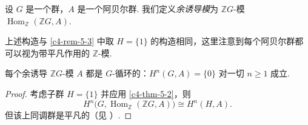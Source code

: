 \begin{definition}\label{c4-def-5-4}
设 $G$ 是一个群，$A$ 是一个阿贝尔群. 我们定义\emph{余诱导模}为 $\mathbb ZG$-模 $\operatorname{Hom}_{\mathbb Z}(\mathbb ZG, A)$.
\end{definition}

\begin{remark}\label{c4-rem-5-5}
上述构造与 \autoref{c4-rem-5-3} 中取 $H=\{1\}$ 的构造相同，这里注意到每个阿贝尔群都可以视为带平凡作用的 $\mathbb Z$-模.
\end{remark}

\begin{proposition}\label{c4-prop-5-3}
每个余诱导 $\mathbb ZG$-模 $A$ 都是 $G$-循环的：$H^n(G, A)=\{0\}$ 对一切 $n\geq 1$ 成立.
\end{proposition}

\begin{proof}
考虑子群 $H=\{1\}$ 并应用 \autoref{c4-thm-5-2}，则
\[
H^n\bigl(G, \operatorname{Hom}_{\mathbb Z}(\mathbb ZG, A)\bigr)\cong H^n(H, A).
\]
但该上同调群是平凡的（见 \cite[Corollary~9.28, \S9.2]{rot09}）.
\end{proof}
